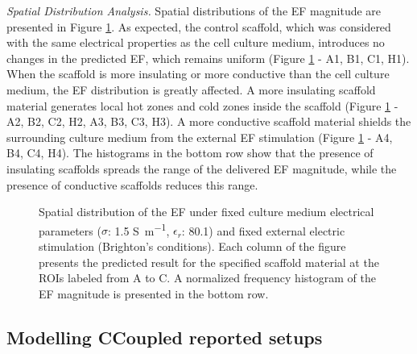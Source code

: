 \noindent \textit{Spatial Distribution Analysis.} Spatial distributions of the \acs{EF} magnitude are presented in Figure \ref{fig5d9}. As expected, the control scaffold, which was considered with the same electrical properties as the cell culture medium, introduces no changes in the predicted \acs{EF}, which remains uniform (Figure \ref{fig5d9} - A1, B1, C1, H1). When the scaffold is more insulating or more conductive than the cell culture medium, the \acs{EF} distribution is greatly affected. A more insulating scaffold material generates local hot zones and cold zones inside the scaffold (Figure \ref{fig5d9} - A2, B2, C2, H2, A3, B3, C3, H3). A more conductive scaffold material shields the surrounding culture medium from the external \acs{EF} stimulation (Figure \ref{fig5d9} - A4, B4, C4, H4). The histograms in the bottom row show that the presence of insulating scaffolds spreads the range of the delivered \acs{EF} magnitude, while the presence of conductive scaffolds reduces this range.


\begin{figure}
\caption{Spatial distribution of the \acs{EF} under fixed culture medium electrical parameters ($\sigma$: \num{1.5} \si{\siemens\per\meter}, $\epsilon_r$: 80.1) and fixed external electric stimulation (Brighton's conditions). Each column of the figure presents the predicted result for the specified scaffold material at the \acs{ROI}s labeled from A to C. A normalized frequency histogram of the \acs{EF} magnitude is presented in the bottom row.}
\label{fig5d9}
\end{figure}


\newpage
\subsection{Modelling \acs{CCoupled} reported setups}


